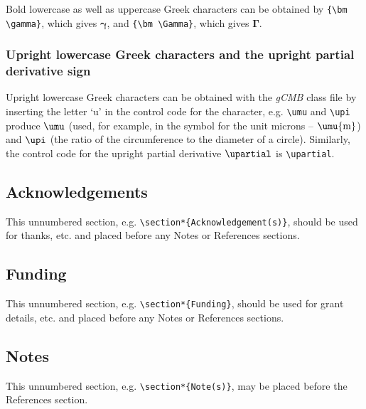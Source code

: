 \documentclass{gCMB2e}
\begin{document}
Bold lowercase as well as uppercase Greek characters can be
obtained by \verb"{\bm \gamma}", which gives ${\bm \gamma}$, and
\verb"{\bm \Gamma}", which gives ${\bm \Gamma}$.

\subsubsection{Upright lowercase Greek characters and the upright partial derivative sign}\label{upgreek}

Upright lowercase Greek characters can be obtained with the \textit{gCMB} class file by inserting the letter `u' in the control
code for the character, e.g. \verb"\umu" and \verb"\upi" produce $\umu$ (used, for example, in the symbol for the
unit microns -- $\umu{\rm m}$) and $\upi$ (the ratio of the circumference to the diameter of a circle). Similarly,
the control code for the upright partial derivative $\upartial$ is \verb"\upartial".


\subsection{Acknowledgements}

This unnumbered section, e.g. \verb"\section*{Acknowledgement(s)}", should be used for thanks, etc.
and placed before any Notes or References sections.


\subsection{Funding}

This unnumbered section, e.g. \verb"\section*{Funding}", should be used for grant details, etc.
and placed before any Notes or References sections.


\subsection{Notes}

This unnumbered section, e.g. \verb"\section*{Note(s)}", may be placed before the References section.
\end{document}
